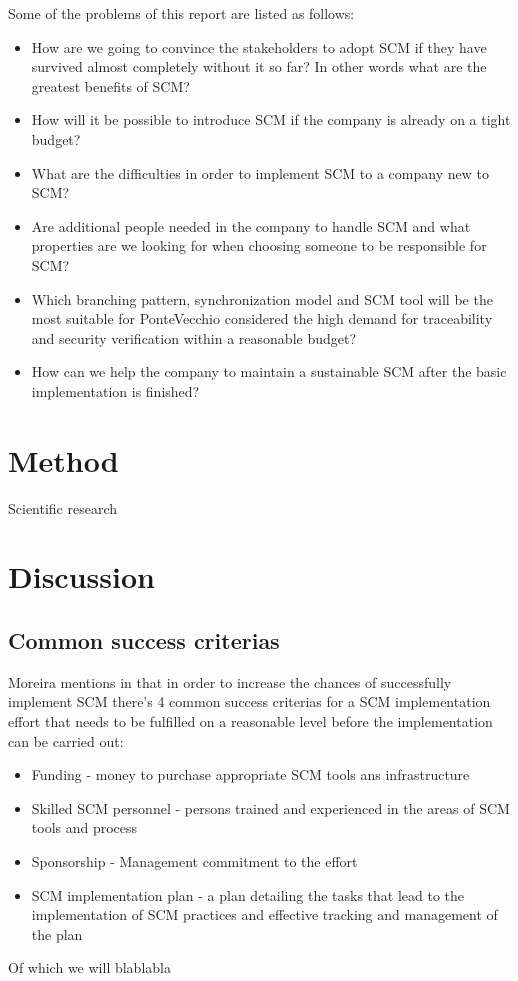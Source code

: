 \documentclass[10pt]{article}
\begin{document}
\hfill \break
\noindent Some of the problems of this report are  listed as follows:
\begin{itemize}
\item How are we going to convince the stakeholders to adopt SCM if they have survived almost completely without it so far? In other words what are the greatest benefits of SCM?
\item How will it be possible to introduce SCM if the company is already on a tight budget?
\item What are the difficulties in order to implement SCM to a company new to SCM?
\item Are additional people needed in the company to handle SCM and what properties are we looking for when choosing someone to be responsible for SCM?
\item Which branching pattern, synchronization model and SCM tool will be the most suitable for PonteVecchio considered the high demand for traceability and security verification within a reasonable budget?
\item How can we help the company to maintain a sustainable SCM after the basic implementation is finished?
\end{itemize}

\section{Method}
Scientific research 

\section{Discussion}
\subsection{Common success criterias}
Moreira mentions in \cite{Moreira} that in order to increase the chances of successfully implement SCM there's 4 common success criterias for a SCM implementation effort that needs to be fulfilled on a reasonable level before the implementation can be carried out:
\begin{itemize}
\item Funding - money to purchase appropriate SCM tools ans infrastructure
\item Skilled SCM personnel - persons trained and experienced in the areas of SCM tools and process
\item Sponsorship - Management commitment to the effort
\item SCM implementation plan - a plan detailing the tasks that lead to the implementation of SCM practices and effective tracking and management of the plan
\end{itemize}
Of which we will blablabla
\end{document}
